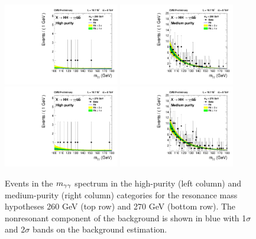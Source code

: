 \begin{figure}[ht]
 \begin{center}
   \includegraphics[width=0.45\textwidth]{figures/results/databkgoversig_cat0_260GeV.pdf}
   \includegraphics[width=0.45\textwidth]{figures/results/databkgoversig_cat1_260GeV.pdf}
   \includegraphics[width=0.45\textwidth]{figures/results/databkgoversig_cat0_270GeV.pdf}
   \includegraphics[width=0.45\textwidth]{figures/results/databkgoversig_cat1_270GeV.pdf}
 \end{center}
\caption{Events in the $m_{\gamma\gamma}$ spectrum in the high-purity (left column) and medium-purity
(right column) categories for the resonance mass hypotheses 260 GeV (top row) and 270 GeV (bottom row).
The nonresonant component of the background is shown in blue
with 1$\sigma$ and 2$\sigma$ bands on the background estimation.}
\label{fig:datafit_260}
\end{figure}


